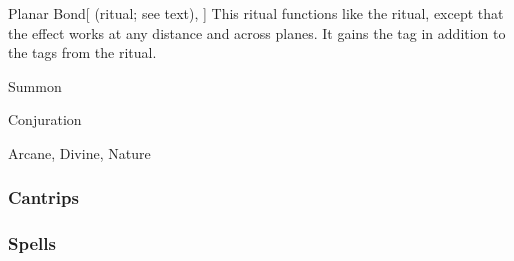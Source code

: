 \lowercase{\hypertarget{spell:Planar Bond}{}}\label{spell:Planar Bond}
\begin{attuneability}[Rank 8]{\hypertarget{spell:Planar Bond}{Planar Bond}}[ (ritual; see text), ]
This ritual functions like the  ritual, except that the effect works at any distance and across planes.
It gains the  tag in addition to the tags from the  ritual.
\end{attuneability}
\vspace{0.25em}


\newpage
\begin{spellsection}{Summon}

\begin{spellheader}
\end{spellheader}


 Conjuration

 Arcane, Divine, Nature

\subsubsection{Cantrips}


\end{spellsection}


\subsubsection{Spells}


